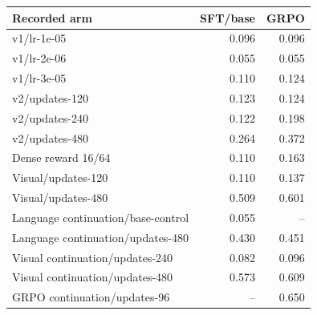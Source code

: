 \begin{tabular}{@{}lrr@{}}
\toprule
Recorded arm & SFT/base & GRPO \\
\midrule
v1/lr-1e-05 & 0.096 & 0.096 \\
v1/lr-2e-06 & 0.055 & 0.055 \\
v1/lr-3e-05 & 0.110 & 0.124 \\
v2/updates-120 & 0.123 & 0.124 \\
v2/updates-240 & 0.122 & 0.198 \\
v2/updates-480 & 0.264 & 0.372 \\
Dense reward 16/64 & 0.110 & 0.163 \\
Visual/updates-120 & 0.110 & 0.137 \\
Visual/updates-480 & 0.509 & 0.601 \\
Language continuation/base-control & 0.055 & -- \\
Language continuation/updates-480 & 0.430 & 0.451 \\
Visual continuation/updates-240 & 0.082 & 0.096 \\
Visual continuation/updates-480 & 0.573 & 0.609 \\
GRPO continuation/updates-96 & -- & 0.650 \\
\bottomrule
\end{tabular}
